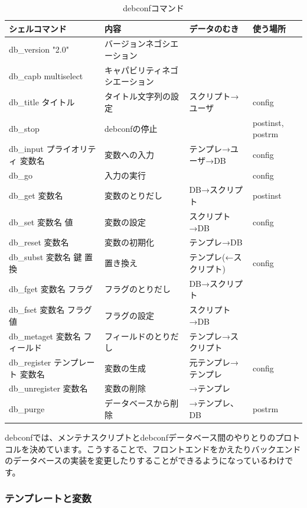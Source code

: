 \documentclass[mingoth,a4paper]{jsarticle}
\begin{document}
\begin{table}[htbp]
 \begin{tabular}[htbp]{|l|l|l|l|}\hline
 シェルコマンド & 内容 & データのむき & 使う場所 \\ \hline
 db\_version "2.0"& バージョンネゴシエーション & & \\ \hline
 db\_capb multiselect & キャパビリティネゴシエーション & & \\ \hline
 db\_title タイトル & タイトル文字列の設定 & スクリプト→ユーザ & config \\ \hline
 db\_stop & debconfの停止 & & postinst, postrm \\ \hline
 db\_input プライオリティ 変数名 & 変数への入力 & テンプレ→ユーザ→DB & config \\ \hline
 db\_go & 入力の実行 & & config \\ \hline
 db\_get 変数名 & 変数のとりだし & DB→スクリプト & postinst \\ \hline
 db\_set 変数名 値 & 変数の設定 & スクリプト→DB & config \\ \hline
 db\_reset 変数名 & 変数の初期化 & テンプレ→DB & \\ \hline
 db\_subst 変数名 鍵 置換 & 置き換え & テンプレ(←スクリプト) & config \\ \hline
 db\_fget 変数名 フラグ & フラグのとりだし & DB→スクリプト & \\ \hline
 db\_fset 変数名 フラグ 値 & フラグの設定 & スクリプト→DB & \\ \hline
 db\_metaget 変数名 フィールド & フィールドのとりだし & テンプレ→スクリプト & \\ \hline
 db\_register テンプレート 変数名 & 変数の生成 & 元テンプレ→テンプレ & config \\ \hline
 db\_unregister 変数名 & 変数の削除 & →テンプレ & \\ \hline
 db\_purge & データベースから削除 & →テンプレ、DB & postrm \\ \hline
 \end{tabular}
 \caption{debconfコマンド}
 \label{debconf:cmd}
\end{table}

debconfでは、メンテナスクリプトとdebconfデータベース間のやりとりのプロトコルを決めています。こうすることで、フロントエンドをかえたりバックエンドのデータベースの実装を変更したりすることができるようになっているわけです。

\newpage

\subsubsection{テンプレートと変数}
\end{document}
